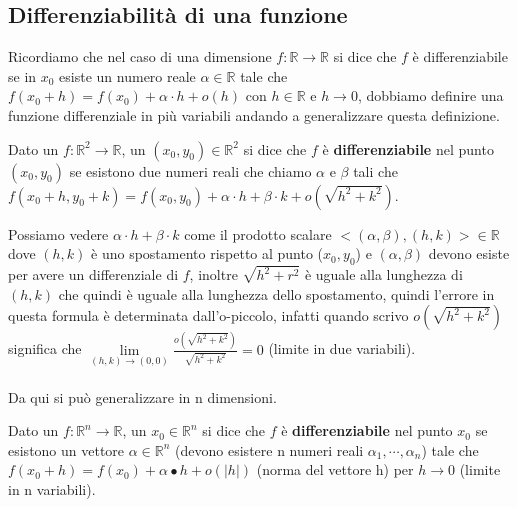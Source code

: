 \subsection{Differenziabilità di una funzione}
Ricordiamo che nel caso di una dimensione $f: \mathbb{R}\to \mathbb{R}$ si dice che $f$ è differenziabile se in $x_0$ esiste un numero reale $\alpha \in \mathbb{R}$ tale che $f(x_0 + h) = f(x_0) + \alpha \cdot h + o(h)$ con $h \in \mathbb{R}$ e $h\to 0$, dobbiamo definire una funzione differenziale in più variabili andando a generalizzare questa definizione.
\begin{definition}
Dato un $f: \mathbb{R}^2 \to \mathbb{R}$, un $(x_0,y_0) \in \mathbb{R}^2$ si dice che $f$ è \textbf{differenziabile} nel punto $(x_0,y_0)$ se esistono due numeri reali che chiamo $\alpha$ e $\beta$ tali che $f(x_0 + h, y_0 + k) = f(x_0, y_0) + \alpha \cdot h + \beta \cdot k + o(\sqrt{h^2 + k^2})$.
\end{definition}
\hspace{-15pt}Possiamo vedere $\alpha \cdot h + \beta \cdot k$ come il prodotto scalare $<(\alpha, \beta), (h,k)> \in \mathbb{R}$ dove $(h,k)$ è uno spostamento rispetto al punto ($x_0,y_0$) e $(\alpha, \beta)$ devono esiste per avere un differenziale di $f$, inoltre $\sqrt{h^2 + r^2}$ è uguale alla lunghezza di $(h,k)$ che quindi è uguale alla lunghezza dello spostamento, quindi l'errore in questa formula è determinata dall'o-piccolo, infatti quando scrivo $o(\sqrt{h^2 + k^2})$ significa che $\lim\limits_{(h,k)\to (0,0)}\frac{o(\sqrt{h^2 + k^2})}{\sqrt{h^2 + k^2}} = 0$ (limite in due variabili).\\\\
Da qui si può generalizzare in n dimensioni.

\begin{definition}
Dato un $f: \mathbb{R}^n \to \mathbb{R}$, un $x_0 \in \mathbb{R}^n$ si dice che $f$ è \textbf{differenziabile} nel punto $x_0$ se esistono un vettore $\alpha \in \mathbb{R}^n$ (devono esistere n numeri reali $\alpha_1, \cdots, \alpha_n$) tale che $f(x_0 + h) = f(x_0) + \alpha \bullet h + o(|h|)$ (norma del vettore h) per $h \to 0$ (limite in n variabili).
\end{definition}

